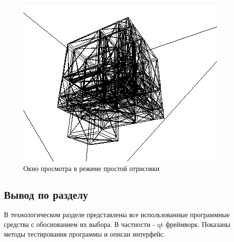 \documentclass[a4paper, 14pt]{report} %
\begin{document}
	\begin{figure}[ht]
		\centering
		\includegraphics[width=0.7\linewidth]{img/scene_carcass}
		\caption{Окно просмотра в режиме простой отрисовки}
		\label{fig:scenecarcass}
	\end{figure}
	
	\subsection{Вывод по разделу}
	В технологическом разделе представлены все использованные программные средства с обоснованием их выбора. В частности - qt фреймворк. Показаны методы тестирования программы и описан интерфейс.
	
	
\end{document}
